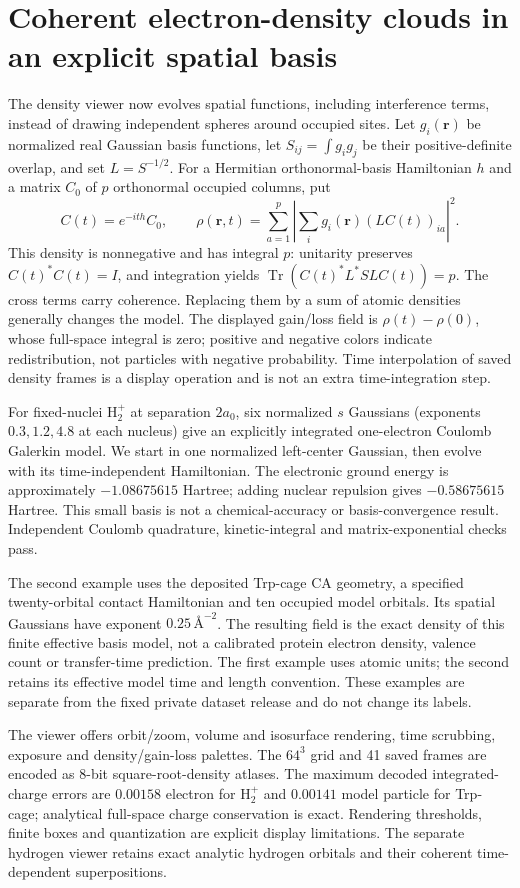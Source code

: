 \documentclass[11pt,oneside,openany]{book}
\theoremstyle{definition}\newtheorem{definition}[theorem]{Definition}
\theoremstyle{remark}\newtheorem{remark}[theorem]{Remark}
\begin{document}
\section{Coherent electron-density clouds in an explicit spatial basis}
The density viewer now evolves spatial functions, including interference
terms, instead of drawing independent spheres around occupied sites. Let
$g_i(\mathbf r)$ be normalized real Gaussian basis functions, let
$S_{ij}=\int g_i g_j$ be their positive-definite overlap, and set
$L=S^{-1/2}$. For a Hermitian orthonormal-basis Hamiltonian $h$ and a matrix
$C_0$ of $p$ orthonormal occupied columns, put
\[
 C(t)=e^{-ith}C_0,\qquad
 \rho(\mathbf r,t)=\sum_{a=1}^p
       \left|\sum_i g_i(\mathbf r)(LC(t))_{ia}\right|^2.
\]
This density is nonnegative and has integral $p$: unitarity preserves
$C(t)^*C(t)=I$, and integration yields
$\operatorname{Tr}(C(t)^*L^*SL C(t))=p$. The cross terms carry coherence.
Replacing them by a sum of atomic densities generally changes the model.
The displayed gain/loss field is $\rho(t)-\rho(0)$, whose full-space integral
is zero; positive and negative colors indicate redistribution, not particles
with negative probability. Time interpolation of saved density frames is a
display operation and is not an extra time-integration step.

For fixed-nuclei $\mathrm H_2^+$ at separation $2a_0$, six normalized $s$
Gaussians (exponents $0.3,1.2,4.8$ at each nucleus) give an explicitly
integrated one-electron Coulomb Galerkin model. We start in one normalized
left-center Gaussian, then evolve with its time-independent Hamiltonian.
The electronic ground energy is approximately $-1.08675615$ Hartree;
adding nuclear repulsion gives $-0.58675615$ Hartree. This small basis is not
a chemical-accuracy or basis-convergence result. Independent Coulomb
quadrature, kinetic-integral and matrix-exponential checks pass.

The second example uses the deposited Trp-cage CA geometry, a specified
twenty-orbital contact Hamiltonian and ten occupied model orbitals. Its
spatial Gaussians have exponent $0.25\,\text{\AA}^{-2}$. The resulting field
is the exact density of this finite effective basis model, not a calibrated
protein electron density, valence count or transfer-time prediction.
The first example uses atomic units; the second retains its effective model
time and length convention. These examples are separate from the fixed
private dataset release and do not change its labels.

The viewer offers orbit/zoom, volume and isosurface rendering, time scrubbing,
exposure and density/gain-loss palettes. The $64^3$ grid and 41 saved frames
are encoded as 8-bit square-root-density atlases. The maximum decoded
integrated-charge errors are $0.00158$ electron for $\mathrm H_2^+$ and
$0.00141$ model particle for Trp-cage; analytical full-space charge
conservation is exact. Rendering thresholds, finite boxes and quantization
are explicit display limitations. The separate hydrogen viewer retains exact
analytic hydrogen orbitals and their coherent time-dependent superpositions.
\end{document}
